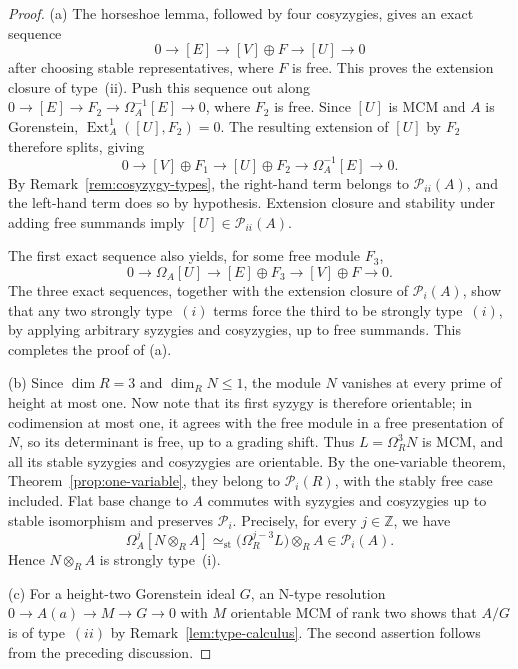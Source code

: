 \documentclass[11pt,letterpaper]{amsart}
\theoremstyle{plain}
\theoremstyle{definition}
\theoremstyle{remark}
\begin{document}
\begin{proof}
\textup{(a)} The horseshoe lemma, followed by four cosyzygies, gives an exact sequence $$0\to[E]\to[V]\oplus F\to[U]\to0$$ after choosing stable representatives, where $F$ is free. This proves the extension closure of type~(ii). Push this sequence out along $0\to[E]\to F_2\to\Omega_A^{-1}[E]\to0$, where $F_2$ is free. Since $[U]$ is MCM and $A$ is Gorenstein, $\operatorname{Ext}_A^1([U],F_2)=0$. The resulting extension of $[U]$ by $F_2$ therefore splits, giving
\[
0\longrightarrow[V]\oplus F_1\longrightarrow[U]\oplus F_2\longrightarrow\Omega_A^{-1}[E]\longrightarrow0.
\]
By Remark~\ref{rem:cosyzygy-types}, the right-hand term belongs to $\mathcal P_{ii}(A)$, and the left-hand term does so by hypothesis. Extension closure and stability under adding free summands imply $[U]\in\mathcal P_{ii}(A)$. 

The first exact sequence also yields, for some free module $F_3$,
\[
0\longrightarrow \Omega_A[U]\longrightarrow [E]\oplus F_3
\longrightarrow [V]\oplus F\longrightarrow 0.
\]
The three exact sequences, together with the extension closure of $\mathcal P_i(A)$,
show that any two strongly type~$(i)$ terms force the third to be strongly
type~$(i)$, by applying arbitrary syzygies and cosyzygies, up to free summands.
This completes the proof of (a).

\par\smallskip
\textup{(b)} Since $\dim R=3$ and $\dim_R N\leq1$, the module $N$ vanishes at every prime of height at most one. Now note that its first syzygy is therefore orientable; in codimension at most one, it agrees with the free module in a free presentation of $N$, so its determinant is free, up to a grading shift. Thus $L=\Omega_R^3N$ is MCM, and all its stable syzygies and cosyzygies are orientable. By the one-variable theorem, Theorem~\ref{prop:one-variable}, they belong to $\mathcal P_i(R)$, with the stably free case included. Flat base change to $A$ commutes with syzygies and cosyzygies up to stable isomorphism and preserves $\mathcal P_i$. Precisely, for every $j\in\mathbb Z$, we have \[\Omega_A^j[N\otimes_R A]\simeq_{\mathrm{st}}\bigl(\Omega_R^{j-3}L\bigr)\otimes_R A\in\mathcal P_i(A).\] Hence $N\otimes_R A$ is strongly type~(i).

\par\smallskip
\textup{(c)} For a height-two Gorenstein ideal $G$, an N-type resolution $0\to A(a)\to M\to G\to0$ with $M$ orientable MCM of rank two shows that $A/G$ is of type~$(ii)$ by Remark~\ref{lem:type-calculus}. The second assertion follows from the preceding discussion.
\end{proof}
\end{document}
